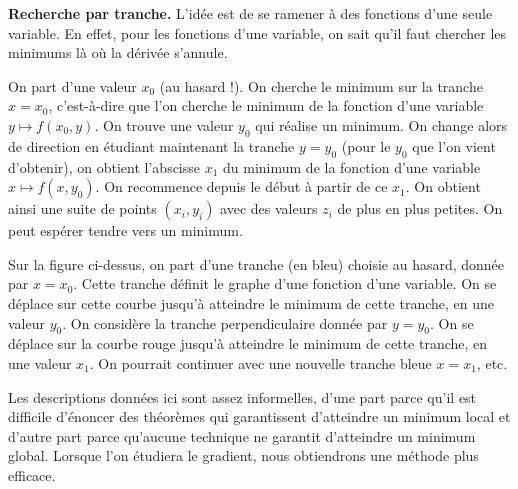 \documentclass[11pt,class=report,crop=false]{standalone}
\begin{document}
\bigskip

\textbf{Recherche par tranche.} 
L'idée est de se ramener à des fonctions d'une seule variable. En effet, 
pour les fonctions d'une variable, on sait qu'il faut chercher les minimums là où la dérivée s'annule.

On part d'une valeur $x_0$ (au hasard !). On cherche le minimum sur la tranche $x=x_0$, c'est-à-dire que l'on cherche le minimum de la fonction d'une variable $y \mapsto f(x_0,y)$. On trouve une valeur $y_0$ qui réalise un minimum. On change alors de direction en étudiant maintenant la tranche $y=y_0$ (pour le $y_0$ que l'on vient d'obtenir), on obtient l'abscisse $x_1$ du minimum de la fonction d'une variable $x \mapsto f(x,y_0)$. On recommence depuis le début à partir de ce $x_1$. On obtient ainsi une suite de points $(x_i,y_i)$ avec des valeurs $z_i$ de plus en plus petites. On peut espérer tendre vers un minimum. %


   
Sur la figure ci-dessus, on part d'une tranche (en bleu) choisie au hasard, donnée par $x=x_0$. Cette tranche définit le graphe d'une fonction d'une variable. On se déplace sur cette courbe jusqu'à atteindre le minimum de cette tranche, en une valeur $y_0$. On considère la tranche perpendiculaire donnée par $y=y_0$. On se déplace sur la courbe rouge jusqu'à atteindre le minimum de cette tranche, en une valeur $x_1$. On pourrait continuer avec une nouvelle tranche bleue $x=x_1$, etc.

\bigskip

Les descriptions données ici sont assez informelles, d'une part parce qu'il est difficile d'énoncer des théorèmes qui garantissent d'atteindre un minimum local et d'autre part parce qu'aucune technique ne garantit d'atteindre un minimum global. Lorsque l'on étudiera le gradient, nous obtiendrons une méthode plus efficace.
\end{document}
